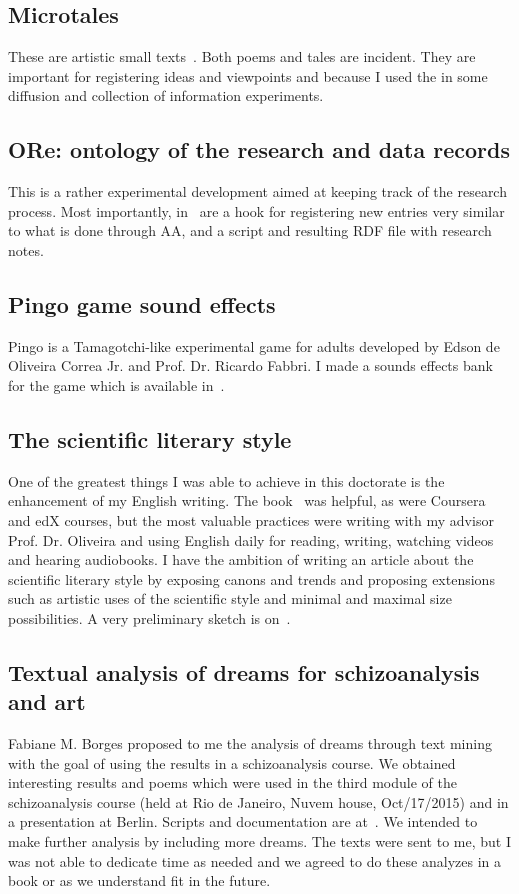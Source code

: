 \begin{apendicesenv}
\subsection{Microtales}
These are artistic small texts~\cite{microcontos}.
Both poems and tales are incident.
They are important for registering ideas and viewpoints
and because I used the in some diffusion and collection of information experiments.

\subsection{ORe: ontology of the research and data records}
This is a rather experimental development aimed at keeping track
of the research process.
Most importantly, in~\cite{ore} are a hook for registering new entries
very similar to what is done through AA, and a script and resulting RDF file
with research notes.

\subsection{Pingo game sound effects}
Pingo is a Tamagotchi-like experimental game for adults
developed by Edson de Oliveira Correa Jr. and Prof. Dr. Ricardo Fabbri.
I made a sounds effects bank for the game which is available in~\cite{pingo}.

\subsection{The scientific literary style}
One of the greatest things I was able to achieve in this doctorate
is the enhancement of my English writing.
The book~\cite{chuLivro} was helpful, as were Coursera and edX courses,
but the most valuable practices were writing with my advisor Prof. Dr. Oliveira
and using English daily for reading, writing, watching videos and hearing audiobooks.
I have the ambition of writing an article about the scientific literary style
by exposing canons and trends and proposing extensions such as artistic uses
of the scientific style and minimal and maximal size possibilities.
A very preliminary sketch is on~\cite{sciStyle}.

\subsection{Textual analysis of dreams for schizoanalysis and art}
Fabiane M. Borges proposed to me the analysis of dreams through text mining
with the goal of using the results in a schizoanalysis course.
We obtained interesting results and poems which were used in
the third module of the schizoanalysis course (held at Rio de Janeiro,
Nuvem house, Oct/17/2015) and in a presentation at Berlin.
Scripts and documentation are at~\cite{sonhos}.
We intended to make further analysis by including more dreams.
The texts were sent to me, but I was not able to dedicate time
as needed and we agreed to do these analyzes in a book or
as we understand fit in the future.


\end{apendicesenv}
